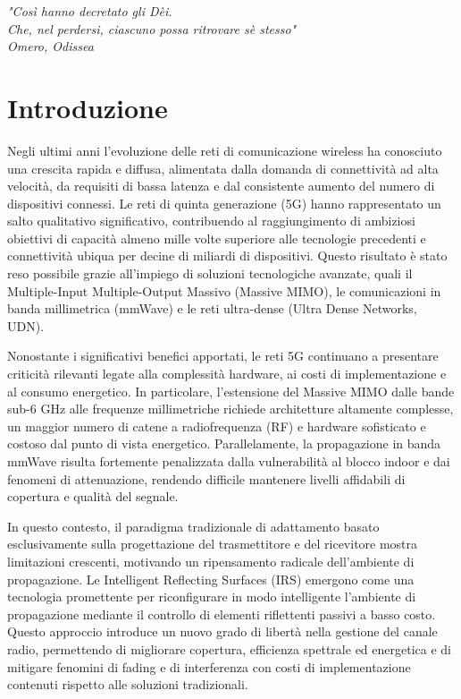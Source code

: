\documentclass[12pt,a4paper]{report}
\begin{document}
\begin{flushright}
  \large\itshape
  "Così hanno decretato gli Dèi.\\ Che, nel perdersi, ciascuno possa
  ritrovare sè stesso" \\[0.4cm]

  Omero, Odissea
\end{flushright}
\endgroup

\chapter*{Introduzione}
\label{chap:introduzione}

Negli ultimi anni l'evoluzione delle reti di comunicazione wireless
ha conosciuto una crescita rapida e diffusa, alimentata dalla domanda
di connettività ad alta velocità, da requisiti di bassa latenza e dal
consistente aumento del numero di dispositivi connessi. Le reti di
quinta generazione (5G) hanno rappresentato un salto qualitativo
significativo, contribuendo al raggiungimento di ambiziosi obiettivi
di capacità almeno mille volte superiore alle tecnologie precedenti e
connettività ubiqua per decine di miliardi di dispositivi. Questo
risultato è stato reso possibile grazie all'impiego di soluzioni
tecnologiche avanzate, quali il Multiple-Input Multiple-Output
Massivo (Massive MIMO), le comunicazioni in banda millimetrica
(mmWave) e le reti ultra-dense (Ultra Dense Networks, UDN).

Nonostante i significativi benefici apportati, le reti 5G continuano
a presentare criticità rilevanti legate alla complessità hardware, ai
costi di implementazione e al consumo energetico. In particolare,
l'estensione del Massive MIMO dalle bande sub-6 GHz alle frequenze
millimetriche richiede architetture altamente complesse, un maggior
numero di catene a radiofrequenza (RF) e hardware sofisticato e
costoso dal punto di vista energetico. Parallelamente, la
propagazione in banda mmWave risulta fortemente penalizzata dalla
vulnerabilità al blocco indoor e dai fenomeni di attenuazione,
rendendo difficile mantenere livelli affidabili di copertura e
qualità del segnale.

In questo contesto, il paradigma tradizionale di adattamento basato
esclusivamente sulla progettazione del trasmettitore e del ricevitore
mostra limitazioni crescenti, motivando un ripensamento radicale
dell'ambiente di propagazione. Le Intelligent Reflecting Surfaces
(IRS) emergono come una tecnologia promettente per riconfigurare in
modo intelligente l'ambiente di propagazione mediante il controllo di
elementi riflettenti passivi a basso costo. Questo approccio
introduce un nuovo grado di libertà nella gestione del canale radio,
permettendo di migliorare copertura, efficienza spettrale ed
energetica e di mitigare fenomini di fading e di interferenza con
costi di implementazione contenuti rispetto alle soluzioni tradizionali.
\end{document}
